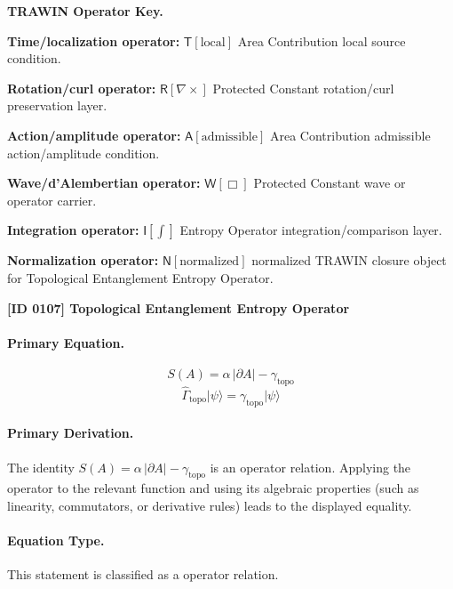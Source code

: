 \par\vspace{0.45\baselineskip}
\noindent\begin{minipage}[t]{\linewidth}
\begingroup
\small
\raggedright
\textbf{TRAWIN Operator Key.}\par
\noindent\textbf{Time/localization operator:} $\mathsf{T}\!\left[\mathrm{local}\right]$ Area Contribution local source condition.\par
\noindent\textbf{Rotation/curl operator:} $\mathsf{R}\!\left[\nabla\times\right]$ Protected Constant rotation/curl preservation layer.\par
\noindent\textbf{Action/amplitude operator:} $\mathsf{A}\!\left[\mathrm{admissible}\right]$ Area Contribution admissible action/amplitude condition.\par
\noindent\textbf{Wave/d'Alembertian operator:} $\mathsf{W}\!\left[\Box\right]$ Protected Constant wave or operator carrier.\par
\noindent\textbf{Integration operator:} $\mathsf{I}\!\left[\int\right]$ Entropy Operator integration/comparison layer.\par
\noindent\textbf{Normalization operator:} $\mathsf{N}\!\left[\mathrm{normalized}\right]$ normalized TRAWIN closure object for Topological Entanglement Entropy Operator.\par
\endgroup
\end{minipage}

\clearpage
\noindent\textbf{[ID 0107] Topological Entanglement Entropy Operator}\par
\vspace{0.35em}
\paragraph{Primary Equation.}
\[
S(A)= \alpha\,\lvert \partial A\rvert - \gamma_{\mathrm{topo}}
\]
\[
\widehat{\Gamma}_{\mathrm{topo}}\lvert\psi\rangle = \gamma_{\mathrm{topo}}\lvert\psi\rangle
\]

\paragraph{Primary Derivation.}
The identity \( S(A)= \alpha\,\lvert \partial A\rvert - \gamma_{\mathrm{topo}} \) is an operator relation. Applying the operator to the relevant function and using its algebraic properties (such as linearity, commutators, or derivative rules) leads to the displayed equality.
\paragraph{Equation Type.}
This statement is classified as a operator relation.

